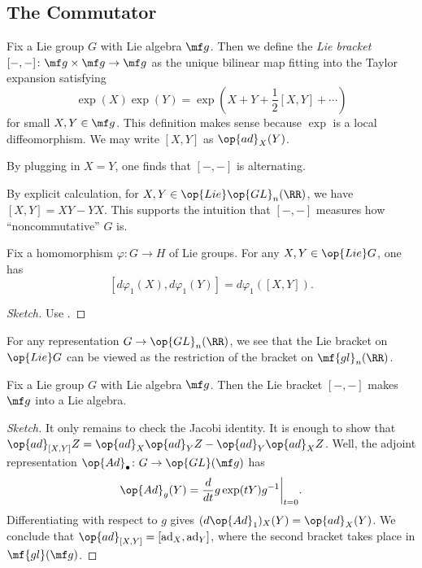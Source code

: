 \documentclass{article}
\begin{document}
\subsection{The Commutator} \label{subsec:commutator}
\begin{definition}[commutator]
	Fix a Lie group $G$ with Lie algebra $\mf g$. Then we define the \textit{Lie bracket} $[-,-]\colon\mf g\times\mf g\to\mf g$ as the unique bilinear map fitting into the Taylor expansion satisfying
	\[\exp(X)\exp(Y)=\exp\left(X+Y+\frac12[X,Y]+\cdots\right)\]
	for small $X,Y\in\mf g$. This definition makes sense because $\exp$ is a local diffeomorphism. We may write $[X,Y]$ as $\op{ad}_X(Y)$.
\end{definition}
\begin{remark}
	By plugging in $X=Y$, one finds that $[-,-]$ is alternating.
\end{remark}
\begin{example}
	By explicit calculation, for $X,Y\in\op{Lie}\op{GL}_n(\RR)$, we have $[X,Y]=XY-YX$. This supports the intuition that $[-,-]$ measures how ``noncommutative'' $G$ is.
\end{example}
\begin{lemma}
	Fix a homomorphism $\varphi\colon G\to H$ of Lie groups. For any $X,Y\in\op{Lie}G$, one has
	\[[d\varphi_1(X),d\varphi_1(Y)]=d\varphi_1([X,Y]).\]
\end{lemma}
\begin{proof}[Sketch]
	Use .
\end{proof}
\begin{example}
	For any representation $G\to\op{GL}_n(\RR)$, we see that the Lie bracket on $\op{Lie}G$ can be viewed as the restriction of the bracket on $\mf{gl}_n(\RR)$.
\end{example}
\begin{proposition} \label{prop:lie-bracket-for-real}
	Fix a Lie group $G$ with Lie algebra $\mf g$. Then the Lie bracket $[-,-]$ makes $\mf g$ into a Lie algebra.
\end{proposition}
\begin{proof}[Sketch]
	It only remains to check the Jacobi identity. It is enough to show that $\op{ad}_{[X,Y]}Z=\op{ad}_X\op{ad}_YZ-\op{ad}_Y\op{ad}_XZ$. Well, the adjoint representation $\op{Ad}_\bullet\colon G\to\op{GL}(\mf g)$ has
	\[\op{Ad}_g(Y)=\frac d{dt}g\exp(tY)g^{-1}\bigg|_{t=0}.\]
	Differentiating with respect to $g$ gives $(d\op{Ad}_1)_X(Y)=\op{ad}_X(Y)$. We conclude that ${\op{ad}_{[X,Y]}}=[\mathrm{ad}_X,\mathrm{ad}_Y]$, where the second bracket takes place in $\mf{gl}(\mf g)$.
\end{proof}
\end{document}
